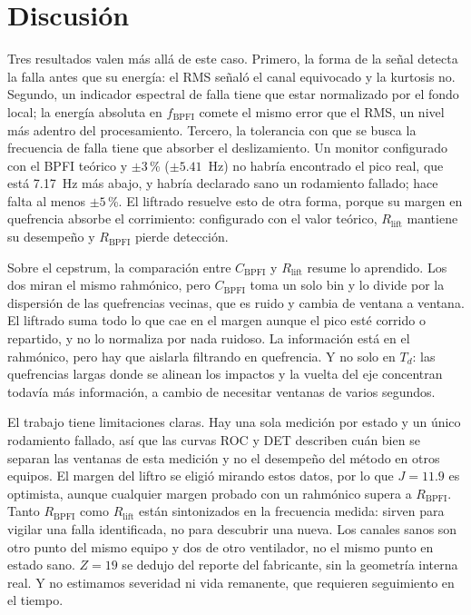 \documentclass[conference,a4paper]{IEEEtran}
\newcommand{\fbpfi}{f_{\mathrm{BPFI}}}
\newcommand{\Rb}{R_{\mathrm{BPFI}}}
\newcommand{\Rl}{R_{\mathrm{lift}}}
\newcommand{\Cb}{C_{\mathrm{BPFI}}}
\begin{document}
\section{Discusión}

Tres resultados valen más allá de este caso. Primero, la forma de la señal detecta la falla antes que su energía: el RMS señaló el canal equivocado y la kurtosis no. Segundo, un indicador espectral de falla tiene que estar normalizado por el fondo local; la energía absoluta en $\fbpfi$ comete el mismo error que el RMS, un nivel más adentro del procesamiento. Tercero, la tolerancia con que se busca la frecuencia de falla tiene que absorber el deslizamiento. Un monitor configurado con el BPFI teórico y $\pm3$\,\% ($\pm5.41$~Hz) no habría encontrado el pico real, que está 7.17~Hz más abajo, y habría declarado sano un rodamiento fallado; hace falta al menos $\pm5$\,\%. El liftrado resuelve esto de otra forma, porque su margen en quefrencia absorbe el corrimiento: configurado con el valor teórico, $\Rl$ mantiene su desempeño y $\Rb$ pierde detección.

Sobre el cepstrum, la comparación entre $\Cb$ y $\Rl$ resume lo aprendido. Los dos miran el mismo rahmónico, pero $\Cb$ toma un solo bin y lo divide por la dispersión de las quefrencias vecinas, que es ruido y cambia de ventana a ventana. El liftrado suma todo lo que cae en el margen aunque el pico esté corrido o repartido, y no lo normaliza por nada ruidoso. La información está en el rahmónico, pero hay que aislarla filtrando en quefrencia. Y no solo en $T_d$: las quefrencias largas donde se alinean los impactos y la vuelta del eje concentran todavía más información, a cambio de necesitar ventanas de varios segundos.

El trabajo tiene limitaciones claras. Hay una sola medición por estado y un único rodamiento fallado, así que las curvas ROC y DET describen cuán bien se separan las ventanas de esta medición y no el desempeño del método en otros equipos. El margen del liftro se eligió mirando estos datos, por lo que $J=11.9$ es optimista, aunque cualquier margen probado con un rahmónico supera a $\Rb$. Tanto $\Rb$ como $\Rl$ están sintonizados en la frecuencia medida: sirven para vigilar una falla identificada, no para descubrir una nueva. Los canales sanos son otro punto del mismo equipo y dos de otro ventilador, no el mismo punto en estado sano. $Z=19$ se dedujo del reporte del fabricante, sin la geometría interna real. Y no estimamos severidad ni vida remanente, que requieren seguimiento en el tiempo.
\end{document}
